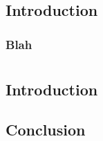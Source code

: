 

\setlength\parindent{0pt} %

\reversemarginpar
\newcommand{\margnote}[1]{\marginpar{\hfill\fontsize{8}{0}{\idblue{(#1)}}}}



%

\tableofcontents

\part{} %
\chapter{Introduction}
\section{Blah}
\chapter{}

\part{} %
\chapter{Introduction}

\newpage
\chapter{Conclusion}

\appendix{}


\newpage
\renewcommand{\bibname}{References}

\begin{footnotesize}

\end{footnotesize}

